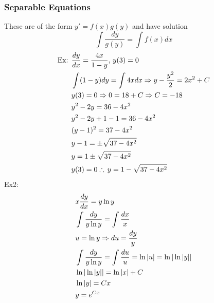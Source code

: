 \documentclass[11pt, fleqn]{article}
\begin{document}
\subsubsection{Separable Equations}
These are of the form $y'=f(x)g(y)$ and have solution
$$\int\frac{dy}{g(y)}=\int f(x)dx$$
\begin{align*}
    \text{Ex: }&\frac{dy}{dx}=\frac{4x}{1-y},\,y(3)=0\\
    &\int(1-y)dy=\int 4xdx\Rightarrow y-\frac{y^2}{2}=2x^2+C\\
    &y(3)=0\Rightarrow0=18+C\Rightarrow C=-18\\
    &y^2-2y=36-4x^2\\
    &y^2-2y+1-1=36-4x^2\\
    &(y-1)^2=37-4x^2\\
    &y-1=\pm\sqrt{37-4x^2}\\
    &y=1\pm\sqrt{37-4x^2}\\
    &y(3)=0\therefore\,y=1-\sqrt{37-4x^2}
\end{align*}
Ex2:
\begin{align*}
    &x\frac{dy}{dx}=y\ln y\\
    &\int\frac{dy}{y\ln y}=\int\frac{dx}{x}\\
    &u=\ln y\Rightarrow du=\frac{dy}{y}\\
    &\int\frac{dy}{y\ln y}=\int\frac{du}{u}=\ln|u|=\ln|\ln|y||\\
    &\ln|\ln|y||=\ln |x|+C\\
    &\ln|y|=Cx\\
    &y=e^{Cx}
\end{align*}
\end{document}
